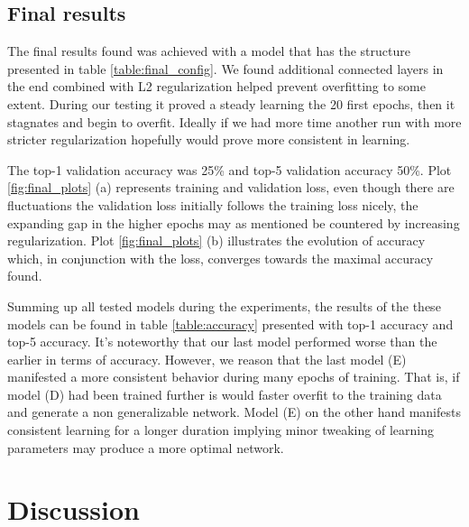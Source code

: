\documentclass{kthreport}
\begin{document}
\subsection{Final results}



\clearpage
\begin{table}
  
\end{table}
The final results found was achieved with a model that has the structure presented in table \ref{table:final_config}. We found additional connected layers in the end combined with L2 regularization helped prevent overfitting to some extent. During our testing it proved a steady learning the 20 first epochs, then it stagnates and begin to overfit. Ideally if we had more time another run with more stricter regularization hopefully would prove more consistent in learning.

The top-1 validation accuracy was 25\% and top-5 validation accuracy 50\%. Plot \ref{fig:final_plots} (a) represents training and validation loss, even though there are fluctuations the validation loss initially follows the training loss nicely, the expanding gap in the higher epochs may as mentioned be countered by increasing regularization. Plot \ref{fig:final_plots} (b) illustrates the evolution of accuracy which, in conjunction with the loss, converges towards the maximal accuracy found.

Summing up all tested models during the experiments, the results of the these models can be found in table \ref{table:accuracy} presented with top-1 accuracy and top-5 accuracy. It's noteworthy that our last model performed worse than the earlier in terms of accuracy. However, we reason that the last model (E) manifested a more consistent behavior during many epochs of training. That is, if model (D) had been trained further is would faster overfit to the training data and generate a non generalizable network. Model (E) on the other hand manifests consistent learning for a longer duration implying minor tweaking of learning parameters may produce a more optimal network. \\




\clearpage
\section{Discussion}
\label{sec:Discussion}
\end{document}
